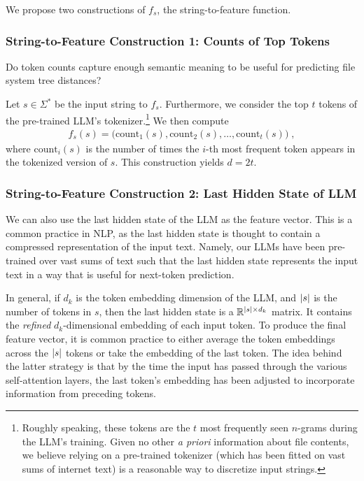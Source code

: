 \documentclass{article}
\begin{document}
We propose two constructions of $f_s$, the string-to-feature function.

\subsubsection{String-to-Feature Construction 1: Counts of Top Tokens}

Do token counts capture enough semantic meaning to be useful for predicting file system tree distances?

Let $s \in \Sigma^*$ be the input string to $f_s$. Furthermore, we consider the top $t$ tokens of the pre-trained LLM's tokenizer.\footnote{Roughly speaking, these tokens are the $t$ most frequently seen $n$-grams during the LLM's training. Given no other \emph{a priori} information about file contents, we believe relying on a pre-trained tokenizer (which has been fitted on vast sums of internet text) is a reasonable way to discretize input strings.} We then compute
\begin{align}
  f_s(s) = \Big( \text{count}_1(s), \text{count}_2(s), \dots, \text{count}_t(s) \Big) \; ,
\end{align}
where $\text{count}_i(s)$ is the number of times the $i$-th most frequent token appears in the tokenized version of $s$. This construction yields $d = 2t$.

\subsubsection{String-to-Feature Construction 2: Last Hidden State of LLM}

We can also use the last hidden state of the LLM as the feature vector. This is a common practice in NLP, as the last hidden state is thought to contain a compressed representation of the input text. Namely, our LLMs have been pre-trained over vast sums of text such that the last hidden state represents the input text in a way that is useful for next-token prediction.

In general, if $d_k$ is the token embedding dimension of the LLM, and $\abs{s}$ is the number of tokens in $s$, then the last hidden state is a $\mathbb R^{\abs{s} \times d_k}$ matrix. It contains the \emph{refined} $d_k$-dimensional embedding of each input token. To produce the final feature vector, it is common practice to either average the token embeddings across the $\abs{s}$ tokens or take the embedding of the last token. The idea behind the latter strategy is that by the time the input has passed through the various self-attention layers, the last token's embedding has been adjusted to incorporate information from preceding tokens.
\end{document}
